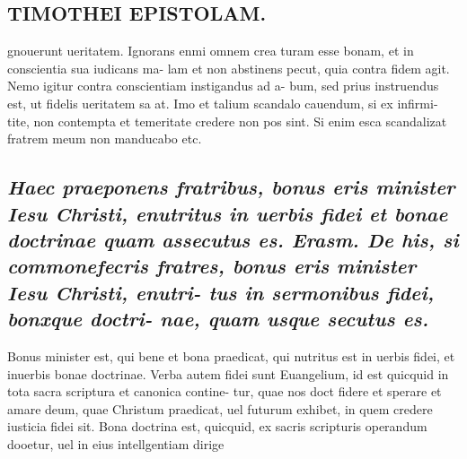\documentclass{article}
\begin{document}
\begin{pages}
\section*{TIMOTHEI EPISTOLAM. }
\marginpar{[ p.101 ]}\pstart gnouerunt ueritatem. Ignorans enmi omnem crea turam esse bonam, et in conscientia sua iudicans ma- lam et non abstinens pecut, quia contra fidem agit. Nemo igitur contra conscientiam instigandus ad a- bum, sed prius instruendus est, ut fidelis ueritatem sa at. Imo et talium scandalo cauendum, si ex infirmi- tite, non contempta et temeritate credere non pos sint. Si enim esca scandalizat fratrem meum non manducabo etc.  \pend
{}
{}
\subsection*{\textit{Haec praeponens fratribus, bonus eris minister Iesu Christi, enutritus in uerbis fidei et bonae doctrinae quam assecutus es. Erasm. De his, si commonefecris fratres, bonus eris minister Iesu Christi, enutri- tus in sermonibus fidei, bonxque doctri- nae, quam usque secutus es. }}\pstart Bonus minister est, qui bene et bona praedicat, qui nutritus est in uerbis fidei, et inuerbis bonae doctrinae. Verba autem fidei sunt Euangelium, id est quicquid in tota sacra scriptura et canonica contine- tur, quae nos doct fidere et sperare et amare deum, quae Christum praedicat, uel futurum exhibet, in quem credere iusticia fidei sit.  \pend\pstart Bona doctrina est, quicquid, ex sacris scripturis operandum dooetur, uel in eius intellgentiam dirige  \pend

\end{pages}
\end{document}
